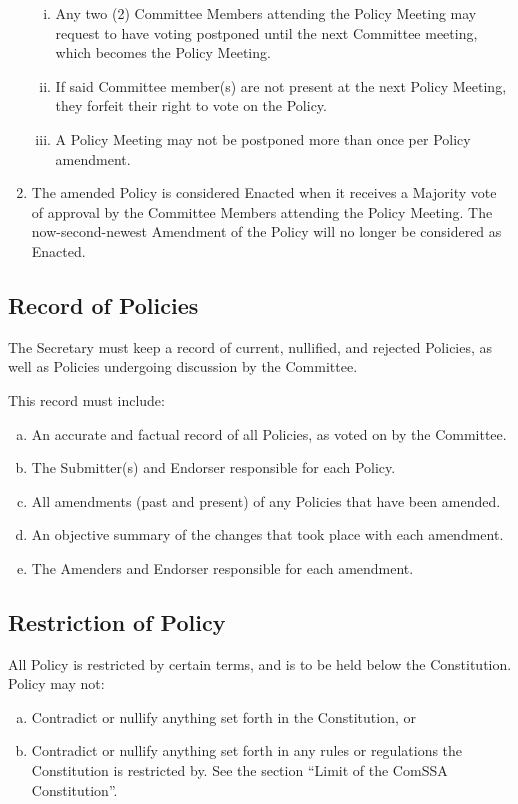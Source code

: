 \documentclass[a4paper,12pt]{article}
\begin{document}
\begin{enumerate}[1)]
	\begin{enumerate}[i)]
		\item Any two (2) Committee Members attending the Policy Meeting may request to have voting postponed until the next Committee meeting, which becomes the Policy Meeting.
		\item If said Committee member(s) are not present at the next Policy Meeting, they forfeit their right to vote on the Policy.
		\item A Policy Meeting may not be postponed more than once per Policy amendment.
	\end{enumerate}
	\item The amended Policy is considered Enacted when it receives a Majority vote of approval by the Committee Members attending the Policy Meeting. The now-second-newest Amendment of the Policy will no longer be considered as Enacted.
\end{enumerate}

\subsection{Record of Policies}

The Secretary must keep a record of current, nullified, and rejected Policies, as well as Policies undergoing discussion by the Committee.

This record must include:

\begin{enumerate}[a)]
	\item An accurate and factual record of all Policies, as voted on by the Committee.
	\item The Submitter(s) and Endorser responsible for each Policy.
	\item All amendments (past and present) of any Policies that have been amended.
	\item An objective summary of the changes that took place with each amendment.
	\item The Amenders and Endorser responsible for each amendment.
\end{enumerate}

\subsection{Restriction of Policy}

All Policy is restricted by certain terms, and is to be held below the Constitution. Policy may not:

\begin{enumerate}[a)]
	\item Contradict or nullify anything set forth in the Constitution, or
	\item Contradict or nullify anything set forth in any rules or regulations the Constitution is restricted by. See the section ``Limit of the ComSSA Constitution''.
\end{enumerate}
\end{document}
